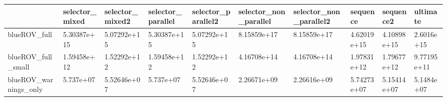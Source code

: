 \begin{tabular}{llllllllll}
\toprule
{} & selector\_mixed & selector\_mixed2 & selector\_parallel & selector\_parallel2 & selector\_non\_parallel & selector\_non\_parallel2 &     sequence &    sequence2 &     ultimate \\
\midrule
blueROV\_full          &    5.30387e+15 &     5.07292e+15 &       5.30387e+15 &        5.07292e+15 &           8.15859e+17 &            8.15859e+17 &  4.62019e+15 &  4.10898e+15 &   2.6016e+15 \\
blueROV\_full\_small    &    1.59458e+12 &     1.52292e+12 &       1.59458e+12 &        1.52292e+12 &           4.16708e+14 &            4.16708e+14 &  1.97831e+12 &  1.79677e+12 &  9.77195e+11 \\
blueROV\_warnings\_only &      5.737e+07 &     5.52646e+07 &         5.737e+07 &        5.52646e+07 &           2.26671e+09 &            2.26616e+09 &  5.74273e+07 &  5.15414e+07 &   5.1484e+07 \\
\bottomrule
\end{tabular}
